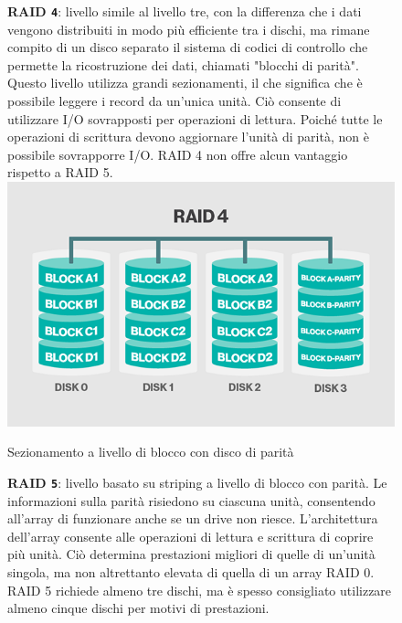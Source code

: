 \begin{itemize}
\begin{figure}[htbp]
\item
\textbf{RAID \verb"4"}: livello simile al livello tre, con la differenza che i dati vengono distribuiti in modo pi\`{u} efficiente tra i dischi, ma rimane compito di un disco separato il sistema di codici di controllo che permette la ricostruzione dei dati, chiamati "blocchi di parit\`{a}".\\
Questo livello utilizza grandi sezionamenti, il che significa che \`{e} possibile leggere i record da un'unica unit\`{a}. Ci\`{o} consente di utilizzare I/O sovrapposti per operazioni di lettura. Poich\'{e} tutte le operazioni di scrittura devono aggiornare l'unit\`{a} di parit\`{a}, non \`{e} possibile sovrapporre I/O. RAID 4 non offre alcun vantaggio rispetto a RAID 5.\cite{etichetta9}\\
\centering
\includegraphics[scale=0.40]{img/raid44.png}\\
\caption{Sezionamento a livello di blocco con disco di parit\`{a}\label{figura1.8} \cite{etichetta9}}
\end{figure}

\begin{figure}[htbp]
\item
\textbf{RAID \verb"5"}: livello basato su striping a livello di blocco con parit\`{a}. Le informazioni sulla parit\`{a} risiedono su ciascuna unit\`{a}, consentendo all'array di funzionare anche se un drive non riesce. L'architettura dell'array consente alle operazioni di lettura e scrittura di coprire pi\`{u} unit\`{a}. Ci\`{o} determina prestazioni migliori di quelle di un'unit\`{a} singola, ma non altrettanto elevata di quella di un array RAID 0.\\ RAID 5 richiede almeno tre dischi, ma \`{e} spesso consigliato utilizzare almeno cinque dischi per motivi di prestazioni.


\end{figure}
\end{itemize}
